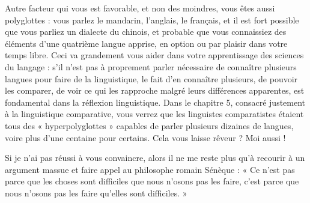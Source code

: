 Autre facteur qui vous est favorable, et non des moindres, vous êtes aussi polyglottes : vous parlez le mandarin, l’anglais, le français, et il est fort possible que vous parliez un dialecte du chinois, et probable que vous connaissiez des éléments d’une quatrième langue apprise, en option ou par plaisir dans votre temps libre. Ceci va grandement vous aider dans votre apprentissage des sciences du langage : s’il n’est pas à proprement parler nécessaire de connaître plusieurs langues pour faire de la linguistique, le fait d’en connaître plusieurs, de pouvoir les comparer, de voir ce qui les rapproche malgré leurs différences apparentes, est fondamental dans la réflexion linguistique. Dans le chapitre 5, consacré justement à la linguistique comparative, vous verrez que les linguistes comparatistes étaient tous des « hyperpolyglottes » capables de parler plusieurs dizaines de langues, voire plus d’une centaine pour certains. Cela vous laisse rêveur ? Moi aussi !

Si je n’ai pas réussi à vous convaincre, alors il ne me reste plus qu’à recourir à un argument massue et faire appel au philosophe romain Sénèque : « Ce n’est pas parce que les choses sont difficiles que nous n’osons pas les faire, c’est parce que nous n’osons pas les faire qu’elles sont difficiles. »

